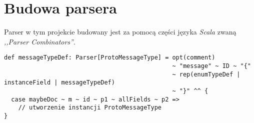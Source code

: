 \chapter{Budowa parsera}
\label{cha:parser}
Parser w tym projekcie budowany jest za pomocą części języka \textit{Scala} zwaną \textit{,,Parser Combinators''}.

\begin{lstlisting}
def messageTypeDef: Parser[ProtoMessageType] = opt(comment) 
                                               ~ "message" ~ ID ~ "{" 
                                               ~ rep(enumTypeDef | instanceField | messageTypeDef) 
                                               ~ "}" ^^ {
  case maybeDoc ~ m ~ id ~ p1 ~ allFields ~ p2 =>
    // utworzenie instancji ProtoMessageType
}
\end{lstlisting}
